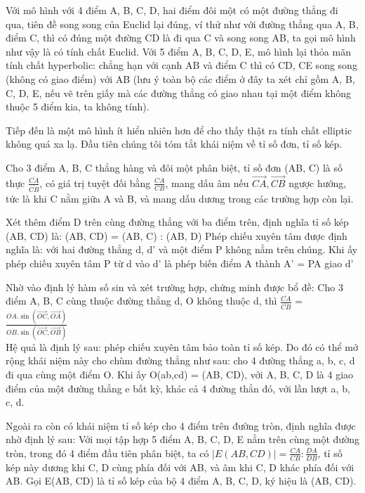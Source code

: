 \begin{multicols}{2}
	Với mô hình với 4 điểm A, B, C, D, hai điểm đôi một có một đường thẳng đi qua, tiên đề song song của Euclid lại đúng, ví thử như với đường thẳng qua A, B, điểm C, thì có đúng một đường CD là đi qua C và song song AB, ta gọi mô hình như vậy là có tính chất Euclid. Với 5 điểm A, B, C, D, E, mô hình lại thỏa mãn tính chất hyperbolic: chẳng hạn với cạnh AB và điểm C thì có CD, CE song song (không có giao điểm) với AB (lưu ý toàn bộ các điểm ở đây ta xét chỉ gồm A, B, C, D, E, nếu vẽ trên giấy mà các đường thẳng có giao nhau tại một điểm không thuộc 5 điểm kia, ta không tính).
	
	Tiếp đến là một mô hình ít hiển nhiên hơn để cho thấy thật ra tính chất elliptic không quá xa lạ. Đầu tiên chúng tôi tóm tắt khái niệm về tỉ số đơn, tỉ số kép. 
	
	Cho 3 điểm A, B, C thẳng hàng và đôi một phân biệt, tỉ số đơn (AB, C) là số thực $ \frac{\overline{CA}}{\overline{CB}}$, có giá trị tuyệt đối bằng $\frac{CA}{CB}$, mang dấu âm nếu $ \vec{CA}, \vec{CB}$ ngược hướng, tức là khi C nằm giữa A và B, và mang dấu dương trong các trường hợp còn lại. 
	
	Xét thêm điểm D trên cùng đường thẳng với ba điểm trên, định nghĩa tỉ số kép (AB, CD) là:
	(AB, CD) = (AB, C) : (AB, D)
	Phép chiếu xuyên tâm được định nghĩa là: với hai đường thẳng d, d’ và một điểm P không nằm trên chúng. Khi ấy phép chiếu xuyên tâm P từ d vào d’ là phép biến điểm A thành A’ = PA giao d’
	
	Nhờ vào định lý hàm số sin và xét trường hợp, chứng minh được bổ đề: Cho 3 điểm A, B, C cùng thuộc đường thẳng d, O không thuộc d, thì $\frac{ \overline{CA}}{\overline{CB}}$ = 
	$\frac{ OA. \sin( \vec{OC} , \vec{OA} )}{OB. \sin( \vec{OC}, \vec{OB})}$ \\
	Hệ quả là định lý sau: phép chiếu xuyên tâm bảo toàn tỉ số kép. Do đó có thể mở rộng khái niệm này cho chùm đường thẳng như sau: cho 4 đường thẳng a, b, c, d đi qua cùng một điểm O. Khi ấy O(ab,cd) = (AB, CD), với A, B, C, D là 4 giao điểm của một đường thẳng e bất kỳ, khác cả 4 đường thẳn đó, với lần lượt a, b, c, d.   
	
	Ngoài ra còn có khái niệm tỉ số kép cho 4 điểm trên đường tròn, định nghĩa được nhờ định lý sau:
	Với mọi tập hợp 5 điểm A, B, C, D, E nằm trên cùng một đường tròn, trong đó 4 điểm đầu tiên phân biệt, ta có $|E(AB, CD)| = \frac{CA}{CB}: \frac{DA}{DB}$, tỉ số kép này dương khi C, D cùng phía đối với AB, và âm khi C, D khác phía đối với AB. Gọi E(AB, CD) là tỉ số kép của bộ 4 điểm A, B, C, D, ký hiệu là (AB, CD).
	

\end{multicols}
